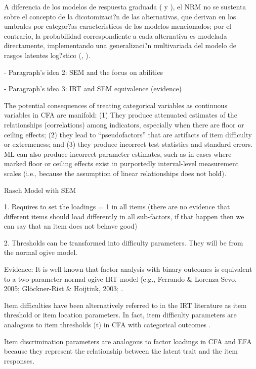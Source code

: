 A diferencia de los modelos de respuesta graduada (\citealt{Samejima1969, Samejima1972} y \citealt[cap?tulo 5]{Ham_Swam1991}), el NRM no se sustenta sobre el concepto de la dicotomizaci?n de las alternativas, que derivan en los umbrales por categor?as caracteristicos de los modelos mencionados; por el contrario, la probabilidad correspondiente a cada alternativa es modelada directamente, implementando una generalizaci?n multivariada del modelo de rasgos latentes log?stico (\citealt{Bock1972}, \citealt{Ostini2006}).



- Paragraph's idea 2: SEM and the focus on abilities




- Paragraph's idea 3: IRT and SEM equivalence (evidence)

\citep{Brown_2015}
The potential consequences of treating categorical variables as continuous variables in CFA are manifold: (1) They produce attenuated estimates of the relationships (correlations) among indicators, especially when there are floor or ceiling effects; (2) they lead to “pseudofactors” that are artifacts of item difficulty or extremeness; and (3) they produce incorrect test statistics and standard errors. ML can also produce  incorrect parameter estimates, such as in cases where marked floor or ceiling effects exist in purportedly interval-level measurement scales (i.e., because the assumption of linear relationships does not hold).


Rasch Model with SEM

1. Requires to set the loadings = 1 in all items 
(there are no evidence that different items should load differently in all sub-factors, if that happen then we can say that an item does not behave good)

2. Thresholds can be transformed into difficulty parameters. They will be from the normal ogive model.


Evidence:
It is well known that factor analysis with binary outcomes is equivalent to a two-parameter normal ogive IRT model (e.g., Ferrando & Lorenza-Sevo, 2005; Glöckner-Rist & Hoijtink, 2003; \citep{Kamata_et_al_2008; Takane_et_al_1987}.

Item difficulties have been alternatively referred to in the IRT literature as item threshold or item location parameters. In fact, item difficulty parameters are analogous to item thresholds (t) in CFA with categorical outcomes \citep{Muthen_et_al_1991}.

Item discrimination parameters are analogous to factor loadings in CFA and EFA because they represent the relationship between the latent trait and the item  responses.

